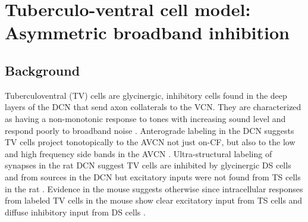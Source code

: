 
\graphicspath{{/media/data/Work/cnstellate/TV_notch/}{/media/data/Work/Responses/}{/media/data/Work/cnstellate/}{/media/data/Work/thesis/ans2010/gfx/}}
\newpage
\section[TV Cell Model]{Tuberculo-ventral cell model: Asymmetric broadband inhibition }
\label{sec:tv-cell-model}

\subsection{Background}

Tuberculoventral (TV) cells are glycinergic, inhibitory cells found in
the deep layers of the DCN that send axon collaterals to the
VCN\@. They are characterized as having a non-monotonic response to
tones with increasing sound level and respond poorly to broadband
noise \citep{SpirouDavisEtAl:1999,NelkenYoung:1997,ReissYoung:2005}.
Anterograde labeling in the DCN suggests TV cells project
tonotopically to the AVCN not just on-CF, but also to the low and high
frequency side bands in the AVCN
\citep{MunirathinamOstapoffEtAl:2004,OstapoffMorestEtAl:1999}.
Ultra-structural labeling of synapses in the rat DCN suggest TV cells
are inhibited by glycinergic DS cells and from sources in the DCN but
excitatory inputs were not found from TS cells in the rat
\citep{Rubio:2005}. Evidence in the mouse suggests otherwise since
intracellular responses from labeled TV cells in the mouse show clear
excitatory input from TS cells and diffuse inhibitory input from DS
cells \citep{ZhangOertel:1993b,WickesbergOertel:1993}.

\medskip{} \citep{SpirouDavisEtAl:1999}



